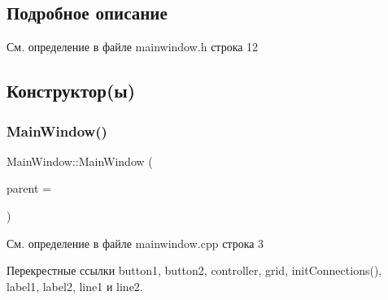 \subsection{Подробное описание}


См. определение в файле mainwindow.\+h строка 12



\subsection{Конструктор(ы)}
\hypertarget{class_main_window_a8b244be8b7b7db1b08de2a2acb9409db}{}\label{class_main_window_a8b244be8b7b7db1b08de2a2acb9409db} 
\subsubsection{\texorpdfstring{Main\+Window()}{MainWindow()}}
{\footnotesize\ttfamily Main\+Window\+::\+Main\+Window (\begin{DoxyParamCaption}\item[{Q\+Widget $\ast$}]{parent = {} }\end{DoxyParamCaption})}



См. определение в файле mainwindow.\+cpp строка 3



Перекрестные ссылки button1, button2, controller, grid, init\+Connections(), label1, label2, line1 и line2.


